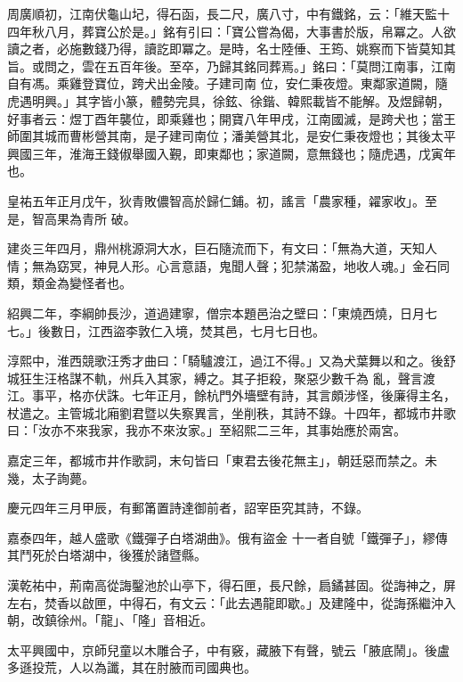 \begin{pinyinscope}
 周廣順初，江南伏龜山圮，得石函，長二尺，廣八寸，中有鐵銘，云：「維天監十四年秋八月，葬寶公於是。」銘有引曰：「寶公嘗為偈，大事書於版，帛冪之。人欲讀之者，必施數錢乃得，讀訖即冪之。是時，名士陸倕、王筠、姚察而下皆莫知其旨。或問之，雲在五百年後。至卒，乃歸其銘同葬焉。」銘曰：「莫問江南事，江南自有馮。乘雞登寶位，跨犬出金陵。子建司南
 位，安仁秉夜燈。東鄰家道闕，隨虎遇明興。」其字皆小篆，體勢完具，徐鉉、徐鍇、韓熙載皆不能解。及煜歸朝，好事者云：煜丁酉年襲位，即乘雞也；開寶八年甲戌，江南國滅，是跨犬也；當王師圍其城而曹彬營其南，是子建司南位；潘美營其北，是安仁秉夜燈也；其後太平興國三年，淮海王錢俶舉國入覲，即東鄰也；家道闕，意無錢也；隨虎遇，戊寅年也。



 皇祐五年正月戊午，狄青敗儂智高於歸仁鋪。初，謠言「農家種，糴家收」。至是，智高果為青所
 破。



 建炎三年四月，鼎州桃源洞大水，巨石隨流而下，有文曰：「無為大道，天知人情；無為窈冥，神見人形。心言意語，鬼聞人聲；犯禁滿盈，地收人魂。」金石同類，類金為變怪者也。



 紹興二年，李綱帥長沙，道過建寧，僧宗本題邑治之壁曰：「東燒西燒，日月七七。」後數日，江西盜李敦仁入境，焚其邑，七月七日也。



 淳熙中，淮西競歌汪秀才曲曰：「騎驢渡江，過江不得。」又為犬葉舞以和之。後舒城狂生汪格謀不軌，州兵入其家，縛之。其子拒殺，聚惡少數千為
 亂，聲言渡江。事平，格亦伏誅。七年正月，餘杭門外墻壁有詩，其言頗涉怪，後廉得主名，杖遣之。主管城北廂劉君暨以失察異言，坐削秩，其詩不錄。十四年，都城市井歌曰：「汝亦不來我家，我亦不來汝家。」至紹熙二三年，其事始應於兩宮。



 嘉定三年，都城市井作歌詞，末句皆曰「東君去後花無主」，朝廷惡而禁之。未幾，太子詢薨。



 慶元四年三月甲辰，有郵筩置詩達御前者，詔宰臣究其詩，不錄。



 嘉泰四年，越人盛歌《鐵彈子白塔湖曲》。俄有盜金
 十一者自號「鐵彈子」，繆傳其鬥死於白塔湖中，後獲於諸暨縣。



 漢乾祐中，荊南高從誨鑿池於山亭下，得石匣，長尺餘，扃鐍甚固。從誨神之，屏左右，焚香以啟匣，中得石，有文云：「此去遇龍即歇。」及建隆中，從誨孫繼沖入朝，改鎮徐州。「龍」、「隆」音相近。



 太平興國中，京師兒童以木雕合子，中有竅，藏腋下有聲，號云「腋底鬧」。後盧多遜投荒，人以為讖，其在肘腋而司國典也。




\end{pinyinscope}
